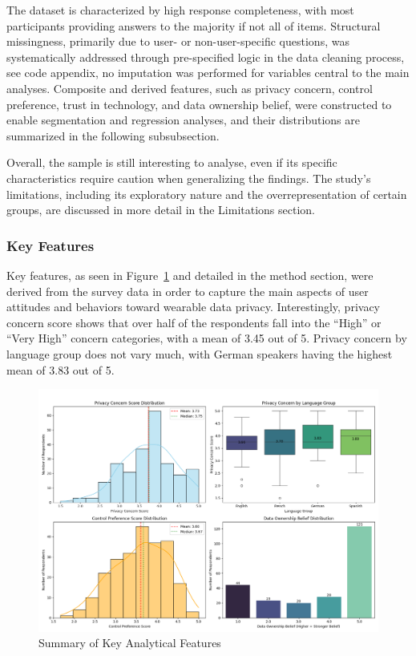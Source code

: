 	The dataset is characterized by high response completeness, with most participants providing answers to the majority if not all of items. Structural missingness, primarily due to user- or non-user-specific questions, was systematically addressed through pre-specified logic in the data cleaning process, see code appendix, no imputation was performed for variables central to the main analyses. Composite and derived features, such as privacy concern, control preference, trust in technology, and data ownership belief, were constructed to enable segmentation and regression analyses, and their distributions are summarized in the following subsubsection.
	
	Overall, the sample is still interesting to analyse, even if its specific characteristics require caution when generalizing the findings. The study's limitations, including its exploratory nature and the overrepresentation of certain groups, are discussed in more detail in the Limitations section.
	\subsubsection{Key Features}
	Key features, as seen in Figure~\ref{fig:derived_features_summary} and detailed in the method section, were derived from the survey data in order to capture the main aspects of user attitudes and behaviors toward wearable data privacy. Interestingly, privacy concern score shows that over half of the respondents fall into the “High” or “Very High” concern categories, with a mean of 3.45 out of 5. Privacy concern by language group does not vary much, with German speakers having the highest mean of 3.83 out of 5.
	\begin{figure}[h!]
        \centering %
		\includegraphics[width=\linewidth]{figures/img/derived_features_summary.png}
		\caption{Summary of Key Analytical Features}
		\label{fig:derived_features_summary}
	\end{figure}
	
